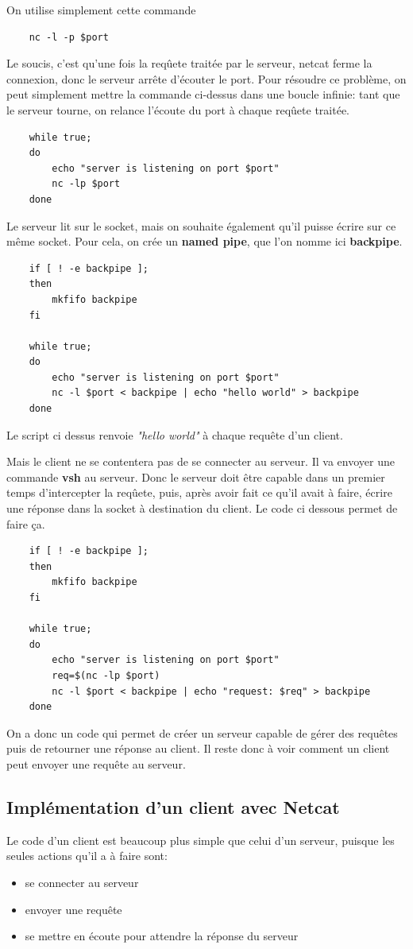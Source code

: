 \documentclass[titlepage]{article}
\begin{document}
	On utilise simplement cette commande
	\begin{lstlisting}
	nc -l -p $port
	\end{lstlisting}

	Le soucis, c'est qu'une fois la reqûete traitée par le serveur, netcat ferme la connexion, donc le serveur arrête d'écouter le port. Pour résoudre ce problème, on peut simplement mettre la commande ci-dessus dans une boucle infinie: tant que le serveur tourne, on relance l'écoute du port à chaque reqûete traitée.
	\begin{lstlisting}
	while true;
	do
		echo "server is listening on port $port"
		nc -lp $port
	done
	\end{lstlisting}

	Le serveur lit sur le socket, mais on souhaite également qu'il puisse écrire sur ce même socket. Pour cela, on crée un \textbf{named pipe}, que l'on nomme ici \textbf{backpipe}.
	\begin{lstlisting}
	if [ ! -e backpipe ];
	then
	    mkfifo backpipe
	fi

	while true;
	do
	    echo "server is listening on port $port"
	    nc -l $port < backpipe | echo "hello world" > backpipe
	done
	\end{lstlisting}

	Le script ci dessus renvoie \textit{"hello world"} à chaque requête d'un client.

	Mais le client ne se contentera pas de se connecter au serveur. Il va envoyer une commande \textbf{vsh} au serveur. Donc le serveur doit être capable dans un premier temps d'intercepter la reqûete, puis, après avoir fait ce qu'il avait à faire, écrire une réponse dans la socket à destination du client. Le code ci dessous permet de faire ça. 

	\begin{lstlisting}
	if [ ! -e backpipe ];
	then
	    mkfifo backpipe
	fi

	while true;
	do
	    echo "server is listening on port $port"
	    req=$(nc -lp $port)
	    nc -l $port < backpipe | echo "request: $req" > backpipe
	done
	\end{lstlisting}

	On a donc un code qui permet de créer un serveur capable de gérer des requêtes puis de retourner une réponse au client. Il reste donc à voir comment un client peut envoyer une requête au serveur.

	\subsection{Implémentation d'un client avec Netcat}
	Le code d'un client est beaucoup plus simple que celui d'un serveur, puisque les seules actions qu'il a à faire sont:
	\begin{itemize}  
		\item se connecter au serveur 
		\item envoyer une requête
		\item se mettre en écoute pour attendre la réponse du serveur
	\end{itemize}
\end{document}
